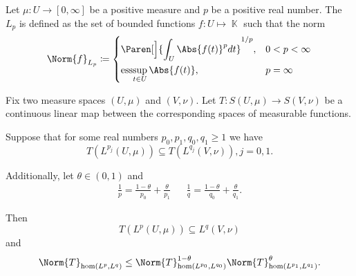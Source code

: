 \begin{definition}\label{def:lebesgue_space}\cite[6]{Bergh1976}
  Let \( \mu: U \to [0, \infty] \) be a positive measure and \( p \) be a positive real number. The  \( L_p \) is defined as the set of bounded functions \( f: U \mapsto \BbbK \) such that the norm
  \begin{equation*}
    \Norm{f}_{L_p} \coloneqq \begin{dcases}
      \Paren[\Big]{\int_U \Abs{f(t)}^p dt}^{1/p}, &0 < p < \infty \\
      \Ess\sup_{t \in U} \Abs{f(t)} , &p = \infty
    \end{dcases}
  \end{equation*}
\end{definition}

\begin{theorem}\label{thm:riesz_thorin}
  Fix two measure spaces \( (U, \mu) \) and \( (V, \nu) \). Let \( T: S(U, \mu) \to S(V, \nu) \) be a continuous linear map between the corresponding spaces of measurable functions.

  Suppose that for some real numbers \( p_0, p_1, q_0, q_1 \geq 1 \) we have
  \begin{equation*}
    T(L^{p_j}(U, \mu)) \subseteq T(L^{q_j}(V, \nu)), j = 0, 1.
  \end{equation*}

  Additionally, let \( \theta \in (0, 1) \) and
  \begin{align*}
    \frac 1 p = \frac {1 - \theta} {p_0} + \frac {\theta} {p_1}
    &&
    \frac 1 q = \frac {1 - \theta} {q_0} + \frac {\theta} {q_1}.
  \end{align*}

  Then
  \begin{equation*}
    T(L^p(U, \mu)) \subseteq L^q(V, \nu)
  \end{equation*}
  and
  \begin{equation*}
    \Norm{T}_{\Hom(L^p, L^q)} \leq \Norm{T}_{\Hom(L^{p_0}, L^{q_0})}^{1 - \theta} \Norm{T}_{\Hom(L^{p_1}, L^{q_1})}^\theta.
  \end{equation*}
\end{theorem}


